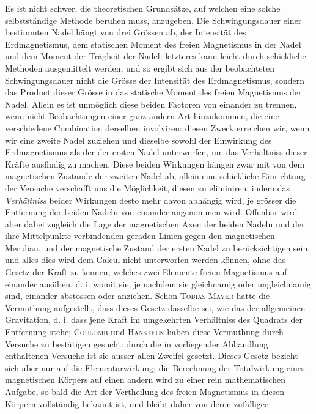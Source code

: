 Es ist nicht schwer, die theoretischen Grundsätze, auf welchen eine solche
selbstständige Methode beruhen muss, anzugeben. Die Schwingungsdauer einer
bestimmten Nadel hängt von drei Grössen ab, der Intensität des Erdmagnetismus,
dem statischen Moment des freien Magnetismus in der Nadel und dem Moment
der Trägheit der Nadel: letzteres kann leicht durch schickliche Methoden
ausgemittelt werden, und so ergibt sich aus der beobachteten Schwingungsdauer
nicht die Grösse der Intensität des Erdmagnetismus, sondern das Product dieser
Grösse in das statische Moment des freien Magnetismus der Nadel. Allein es
ist unmöglich diese beiden Factoren von einander zu trennen, wenn nicht
Beobachtungen einer ganz andern Art hinzukommen, die eine verschiedene
Combination derselben involviren: diesen Zweck erreichen wir, wenn wir eine
zweite Nadel zuziehen und dieselbe sowohl der Einwirkung des Erdmagnetismus
als der der ersten Nadel unterwerfen, um das Verhältniss dieser Kräfte
ausfindig zu machen. Diese beiden Wirkungen hängen zwar mit von dem
magnetischen Zustande der
\clearpage
{}
\noindent
zweiten Nadel ab, allein eine schickliche Einrichtung der Versuche verschafft
uns die Möglichkeit, diesen zu eliminiren, indem das \textit{Verhältniss}
beider Wirkungen desto mehr davon abhängig wird, je grösser die Entfernung
der beiden Nadeln von einander angenommen wird. Offenbar wird aber dabei
zugleich die Lage der magnetischen Axen der beiden Nadeln und der ihre
Mittelpunkte verbindenden geraden Linien gegen den magnetischen Meridian,
und der magnetische Zustand der ersten Nadel zu berücksichtigen sein,
und alles dies wird dem Calcul nicht unterworfen werden können, ohne
das Gesetz der Kraft zu kennen, welches zwei Elemente freien Magnetismus
auf einander ausüben, d. i. womit sie, je nachdem sie gleichnamig oder
ungleichnamig sind, einander abstossen oder anziehen. Schon
\textsc{Tobias Mayer} hatte die Vermuthung aufgestellt, dass dieses Gesetz
dasselbe sei, wie das der allgemeinen Gravitation, d. i. dass jene Kraft
im umgekehrten Verhältniss des Quadrats der Entfernung stehe; \textsc{Coulomb}
und \textsc{Hansteen} haben diese Vermuthung durch Versuche zu bestätigen
gesucht: durch die in vorliegender Abhandlung enthaltenen Versuche ist
sie ausser allen Zweifel gesetzt. Dieses Gesetz bezieht sich aber nur
auf die Elementarwirkung; die Berechnung der Totalwirkung eines
magnetischen Körpers auf einen andern wird zu einer rein mathematischen
Aufgabe, so bald die Art der Vertheilung des freien Magnetismus in diesen
Körpern vollständig bekannt ist, und bleibt daher von deren zufälliger
